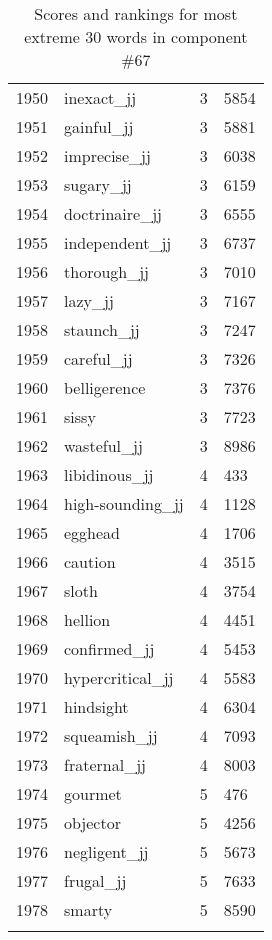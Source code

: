 \begin{longtable}[!htbp]{| rlr@{.}l |}
    1950 & inexact\_jj & 3 & 5854 \\
    1951 & gainful\_jj & 3 & 5881 \\
    1952 & imprecise\_jj & 3 & 6038 \\
    1953 & sugary\_jj & 3 & 6159 \\
    1954 & doctrinaire\_jj & 3 & 6555 \\
    1955 & independent\_jj & 3 & 6737 \\
    1956 & thorough\_jj & 3 & 7010 \\
    1957 & lazy\_jj & 3 & 7167 \\
    1958 & staunch\_jj & 3 & 7247 \\
    1959 & careful\_jj & 3 & 7326 \\
    1960 & belligerence & 3 & 7376 \\
    1961 & sissy & 3 & 7723 \\
    1962 & wasteful\_jj & 3 & 8986 \\
    1963 & libidinous\_jj & 4 & 433 \\
    1964 & high-sounding\_jj & 4 & 1128 \\
    1965 & egghead & 4 & 1706 \\
    1966 & caution & 4 & 3515 \\
    1967 & sloth & 4 & 3754 \\
    1968 & hellion & 4 & 4451 \\
    1969 & confirmed\_jj & 4 & 5453 \\
    1970 & hypercritical\_jj & 4 & 5583 \\
    1971 & hindsight & 4 & 6304 \\
    1972 & squeamish\_jj & 4 & 7093 \\
    1973 & fraternal\_jj & 4 & 8003 \\
    1974 & gourmet & 5 & 476 \\
    1975 & objector & 5 & 4256 \\
    1976 & negligent\_jj & 5 & 5673 \\
    1977 & frugal\_jj & 5 & 7633 \\
    1978 & smarty & 5 & 8590 \\
    \hline
    \caption{Scores and rankings for most extreme 30 words in component \#67} \\
\end{longtable}
